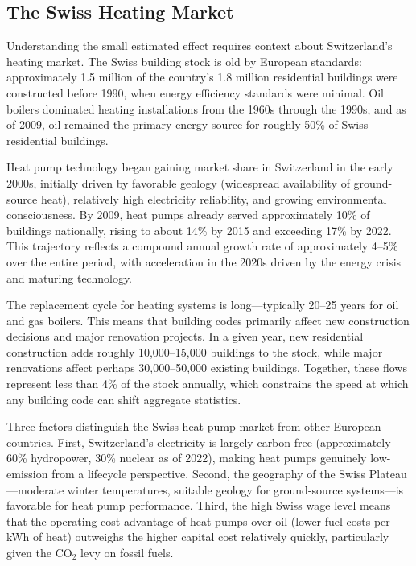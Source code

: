 \documentclass[12pt]{article}
\begin{document}
\subsection{The Swiss Heating Market}

Understanding the small estimated effect requires context about Switzerland's heating market. The Swiss building stock is old by European standards: approximately 1.5 million of the country's 1.8 million residential buildings were constructed before 1990, when energy efficiency standards were minimal. Oil boilers dominated heating installations from the 1960s through the 1990s, and as of 2009, oil remained the primary energy source for roughly 50\% of Swiss residential buildings.

Heat pump technology began gaining market share in Switzerland in the early 2000s, initially driven by favorable geology (widespread availability of ground-source heat), relatively high electricity reliability, and growing environmental consciousness. By 2009, heat pumps already served approximately 10\% of buildings nationally, rising to about 14\% by 2015 and exceeding 17\% by 2022. This trajectory reflects a compound annual growth rate of approximately 4--5\% over the entire period, with acceleration in the 2020s driven by the energy crisis and maturing technology.

The replacement cycle for heating systems is long---typically 20--25 years for oil and gas boilers. This means that building codes primarily affect new construction decisions and major renovation projects. In a given year, new residential construction adds roughly 10,000--15,000 buildings to the stock, while major renovations affect perhaps 30,000--50,000 existing buildings. Together, these flows represent less than 4\% of the stock annually, which constrains the speed at which any building code can shift aggregate statistics.

Three factors distinguish the Swiss heat pump market from other European countries. First, Switzerland's electricity is largely carbon-free (approximately 60\% hydropower, 30\% nuclear as of 2022), making heat pumps genuinely low-emission from a lifecycle perspective. Second, the geography of the Swiss Plateau---moderate winter temperatures, suitable geology for ground-source systems---is favorable for heat pump performance. Third, the high Swiss wage level means that the operating cost advantage of heat pumps over oil (lower fuel costs per kWh of heat) outweighs the higher capital cost relatively quickly, particularly given the CO$_2$ levy on fossil fuels.
\end{document}
